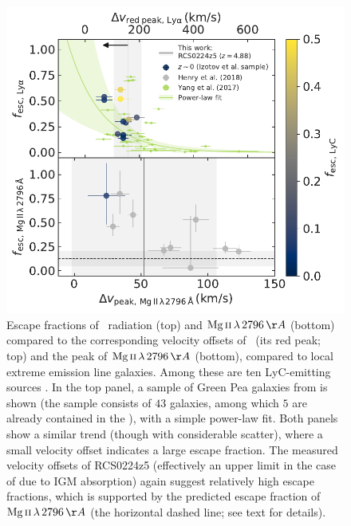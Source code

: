 \begin{figure}
    \centering
    \includegraphics[width=\columnwidth]{"Plots/Chapter2/Lya-MgII_v_offsets_fesc"}
    \caption[Escape fractions compared to velocity offsets of \lya\ and $\MgII \, \lambda \, 2796 \, \Angstrom$]{Escape fractions of \lya\ radiation (top) and $\MgII \, \lambda \, 2796 \, \Angstrom$ (bottom) compared to the corresponding velocity offsets of \lya\ (its red peak; top) and the peak of $\MgII \, \lambda \, 2796 \, \Angstrom$ (bottom), compared to local extreme emission line galaxies. Among these are ten LyC-emitting sources \citep[the \Isample\ and][, coloured according to the escape fraction of LyC, if known]{2018ApJ...855...96H}. In the top panel, a sample of Green Pea galaxies from \citet{2016ApJ...820..130Y, 2017ApJ...844..171Y} is shown (the sample consists of $43$ galaxies, among which $5$ are already contained in the \Isample), with a simple power-law fit. Both panels show a similar trend (though with considerable scatter), where a small velocity offset indicates a large escape fraction. The measured velocity offsets of RCS0224z5 (effectively an upper limit in the case of {\lya} due to IGM absorption) again suggest relatively high escape fractions, which is supported by the predicted escape fraction of $\MgII \, \lambda \, 2796 \, \Angstrom$ (the horizontal dashed line; see text for details).
    }
    \label{fig:Lya/LyC-MgII escape and velocity offsets}
\end{figure}

